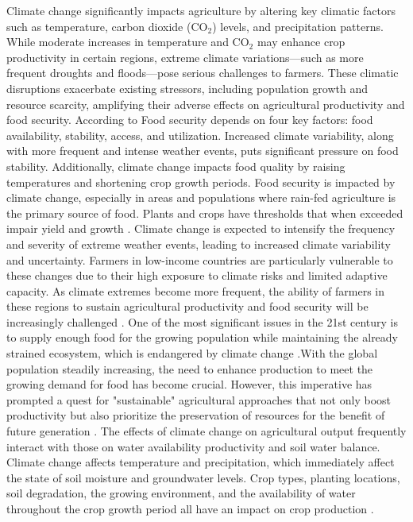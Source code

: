 Climate change significantly impacts agriculture by altering key climatic factors such as temperature, carbon dioxide (CO$_2$) levels, and precipitation patterns. While moderate increases in temperature and CO$_2$ may enhance crop productivity in certain regions, extreme climate variations—such as more frequent droughts and floods—pose serious challenges to farmers. These climatic disruptions exacerbate existing stressors, including population growth and resource scarcity, amplifying their adverse effects on agricultural productivity and food security\parencite{global_paudel_2015}.
According to \textcite{kangClimateChangeImpacts2009} Food security depends on four key factors: food availability, stability, access, and utilization. Increased climate variability, along with more frequent and intense weather events, puts significant pressure on food stability. Additionally, climate change impacts food quality by raising temperatures and shortening crop growth periods. Food security is impacted by climate change, especially in areas and populations where rain-fed agriculture is the primary source of food. Plants and crops have thresholds that when exceeded impair yield and growth \parencite{mulunehImpactClimateChange2021}. Climate change is expected to intensify the frequency and severity of extreme weather events, leading to increased climate variability and uncertainty. Farmers in low-income countries are particularly vulnerable to these changes due to their high exposure to climate risks and limited adaptive capacity.  As climate extremes become more frequent, the ability of farmers in these regions to sustain agricultural productivity and food security will be increasingly challenged \parencite{budhathokiAssessingFarmersPreparedness2020}. 
One of the most significant issues in the 21st century is to supply enough food for the growing population while maintaining the already strained ecosystem, which is endangered by climate change \parencite{kangClimateChangeImpacts2009}.With the global population steadily increasing, the need to enhance production to meet the growing demand for food has become crucial. However, this imperative has prompted a quest for "sustainable" agricultural approaches that not only boost productivity but also prioritize the preservation of resources for the benefit of future generation \parencite{singhSocioeconomicStatusQualitative2022}. 
The effects of climate change on agricultural output frequently interact with those on water availability productivity and soil water balance. Climate change affects temperature and precipitation, which immediately affect the state of soil moisture and groundwater levels. Crop types, planting locations, soil degradation, the growing environment, and the availability of water throughout the crop growth period all have an impact on crop production \parencite{risalImpactClimateChange2022}.
